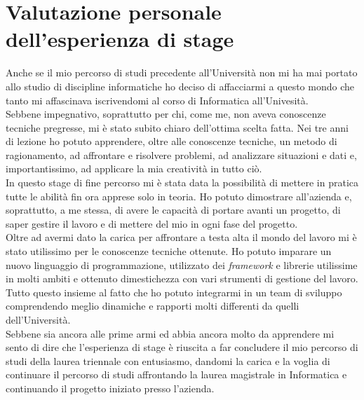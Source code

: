\section{Valutazione personale dell'esperienza di stage}
Anche se il mio percorso di studi precedente all'Università non mi ha mai portato allo studio di discipline informatiche ho deciso di affacciarmi a questo mondo che tanto mi affascinava iscrivendomi al corso di Informatica all'Univesità. \\
Sebbene impegnativo, soprattutto per chi, come me, non aveva conoscenze tecniche pregresse, mi è stato subito chiaro dell'ottima scelta fatta. Nei tre anni di lezione ho potuto apprendere, oltre alle conoscenze tecniche, un metodo di ragionamento, ad affrontare e risolvere problemi, ad analizzare situazioni e dati e, importantissimo, ad applicare la mia creatività in tutto ciò.\\
In questo stage di fine percorso mi è stata data la possibilità di mettere in pratica tutte le abilità fin ora apprese solo in teoria. Ho potuto dimostrare all'azienda e, soprattutto, a me stessa, di avere le capacità di portare avanti un progetto, di saper gestire il lavoro e di mettere del mio in ogni fase del progetto.\\
Oltre ad avermi dato la carica per affrontare a testa alta il mondo del lavoro mi è stato utilissimo per le conoscenze tecniche ottenute. Ho potuto imparare un nuovo linguaggio di programmazione, utilizzato dei \emph{framework} e librerie utilissime in molti ambiti e ottenuto dimestichezza con vari strumenti di gestione del lavoro. Tutto questo insieme al fatto che ho potuto integrarmi in un team di sviluppo comprendendo meglio dinamiche e rapporti molti differenti da quelli dell'Università.\\
Sebbene sia ancora alle prime armi ed abbia ancora molto da apprendere mi sento di dire che l'esperienza di stage è riuscita a far concludere il mio percorso di studi della laurea triennale con entusiasmo, dandomi la carica e la voglia di continuare il percorso di studi affrontando la laurea magistrale in Informatica e continuando il progetto iniziato presso l'azienda.